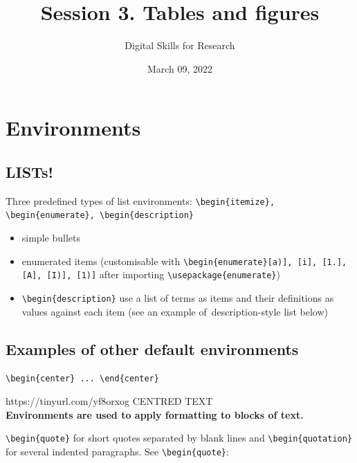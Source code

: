 \documentclass[a4paper,11pt]{article}
\title{Session 3. Tables and figures}
\author{Digital Skills for Research}
\date{March 09, 2022}
\begin{document}
\clearpage
\maketitle
\thispagestyle{empty}

\tableofcontents

\section{Environments}

\subsection{LISTs!}

Three predefined types of list environments: \verb|\begin{itemize}, \begin{enumerate}, \begin{description}|

\begin{itemize}
	\item simple bullets
	\item enumerated items (customisable with \verb|\begin{enumerate}[a)], [i], [1.], [A], [I)], [1)]| after importing \verb|\usepackage{enumerate}|)
	\item \verb|\begin{description}| use a list of terms as items and their definitions as values against each item (see an example of~\hypertarget{wd:descr}{description-style list} below)
\end{itemize}

\subsection{Examples of other default environments}

\verb|\begin{center} ... \end{center}|

\begin{center}https://tinyurl.com/yf8orxog
CENTRED TEXT\\
\textbf{Environments are used to apply formatting to blocks of text.}
\end{center}

\verb|\begin{quote}| for short quotes separated by blank lines and \verb|\begin{quotation}| for several indented paragraphs. See \verb|\begin{quote}|:
\end{document}
